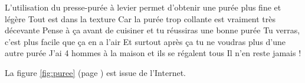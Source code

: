 \documentclass[10pt,a4paper]{article}
\begin{document}
\begin{center}
L’utilisation du presse-purée à levier permet d’obtenir une purée plus fine et légère \newline
Tout est dans la texture \newline
Car la purée trop collante est vraiment très décevante \newline
Pense à ça avant de cuisiner et tu réussiras une bonne purée \newline
Tu verras, c'est plus facile que ça en a l'air \newline
Et surtout après ça tu ne voudras plus d'une autre purée \newline
J'ai 4 hommes à la maison et ils se régalent tous \newline
Il n'en reste jamais ! \newline
\end{center}

La figure \ref{fig:puree} (page \pageref{fig:puree}) est issue de l'Internet.
\end{document}
